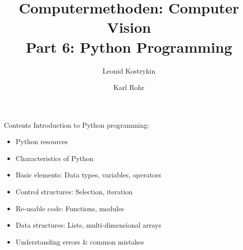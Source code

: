 \documentclass[aspectratio=169]{beamer}
\title{Computermethoden: Computer Vision\\Part 6: Python Programming}
\author{Leonid Kostrykin \and Karl Rohr}
\institute[BMCV Group, Heidelberg University and DKFZ]{Biomedical Computer Vision Group (BMCV) \\ BioQuant, IPMB, Heidelberg University}
\date{}
\begin{document}
\begin{frame}
\titlepage%
\end{frame}


\begin{frame}{Contents}
\alert{Introduction to Python programming:}
\begin{itemize}
\item Python resources
\item Characteristics of Python
\item Basic elements: Data types, variables, operators
\item Control structures: Selection, iteration
\item Re-usable code: Functions, modules
\item Data structures: Lists, multi-dimensional arrays
\item Understanding errors \& common mistakes
\end{itemize}
\end{frame}
\end{document}
